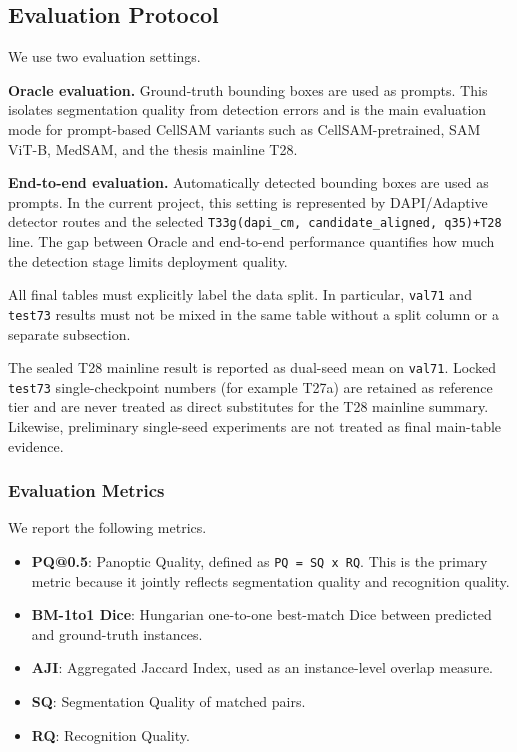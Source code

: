 \subsection{Evaluation Protocol}\label{evaluation-protocol}

We use two evaluation settings.

\textbf{Oracle evaluation.} Ground-truth bounding boxes are used as prompts. This isolates segmentation quality from detection errors and is the main evaluation mode for prompt-based CellSAM variants such as CellSAM-pretrained, SAM ViT-B, MedSAM, and the thesis mainline T28.

\textbf{End-to-end evaluation.} Automatically detected bounding boxes are used as prompts. In the current project, this setting is represented by DAPI/Adaptive detector routes and the selected \texttt{T33g(dapi\_cm,\ candidate\_aligned,\ q35)+T28} line. The gap between Oracle and end-to-end performance quantifies how much the detection stage limits deployment quality.

All final tables must explicitly label the data split. In particular, \texttt{val71} and \texttt{test73} results must not be mixed in the same table without a split column or a separate subsection.

The sealed T28 mainline result is reported as dual-seed mean on \texttt{val71}. Locked \texttt{test73} single-checkpoint numbers (for example T27a) are retained as reference tier and are never treated as direct substitutes for the T28 mainline summary. Likewise, preliminary single-seed experiments are not treated as final main-table evidence.

\subsubsection{Evaluation Metrics}\label{evaluation-metrics}

We report the following metrics.

\begin{itemize}
\tightlist
\item
  \textbf{PQ@0.5}: Panoptic Quality, defined as \texttt{PQ\ =\ SQ\ x\ RQ}. This is the primary metric because it jointly reflects segmentation quality and recognition quality.
\item
  \textbf{BM-1to1 Dice}: Hungarian one-to-one best-match Dice between predicted and ground-truth instances.
\item
  \textbf{AJI}: Aggregated Jaccard Index, used as an instance-level overlap measure.
\item
  \textbf{SQ}: Segmentation Quality of matched pairs.
\item
  \textbf{RQ}: Recognition Quality.
\end{itemize}

